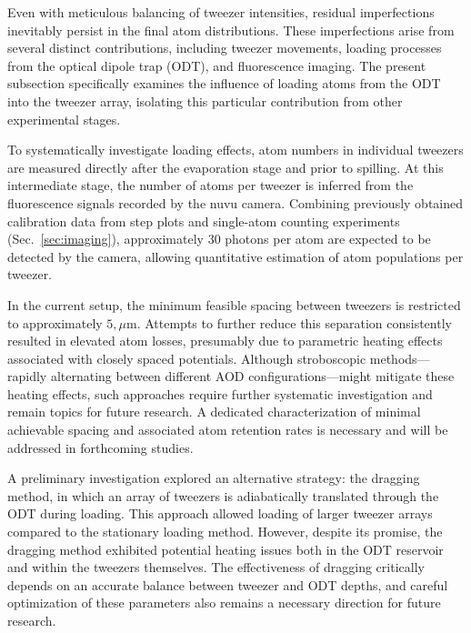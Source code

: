 Even with meticulous balancing of tweezer intensities, residual imperfections inevitably persist in the final atom distributions. These imperfections arise from several distinct contributions, including tweezer movements, loading processes from the optical dipole trap (ODT), and fluorescence imaging. The present subsection specifically examines the influence of loading atoms from the ODT into the tweezer array, isolating this particular contribution from other experimental stages.

To systematically investigate loading effects, atom numbers in individual tweezers are measured directly after the evaporation stage and prior to spilling. At this intermediate stage, the number of atoms per tweezer is inferred from the fluorescence signals recorded by the nuvu camera. Combining previously obtained calibration data from step plots and single-atom counting experiments (Sec.~\ref{sec:imaging}), approximately 30 photons per atom are expected to be detected by the camera, allowing quantitative estimation of atom populations per tweezer.

In the current setup, the minimum feasible spacing between tweezers is restricted to approximately $5,\mu$m. Attempts to further reduce this separation consistently resulted in elevated atom losses, presumably due to parametric heating effects associated with closely spaced potentials. Although stroboscopic methods—rapidly alternating between different AOD configurations—might mitigate these heating effects, such approaches require further systematic investigation and remain topics for future research. A dedicated characterization of minimal achievable spacing and associated atom retention rates is necessary and will be addressed in forthcoming studies.

A preliminary investigation explored an alternative strategy: the dragging method, in which an array of tweezers is adiabatically translated through the ODT during loading. This approach allowed loading of larger tweezer arrays compared to the stationary loading method. However, despite its promise, the dragging method exhibited potential heating issues both in the ODT reservoir and within the tweezers themselves. The effectiveness of dragging critically depends on an accurate balance between tweezer and ODT depths, and careful optimization of these parameters also remains a necessary direction for future research.


